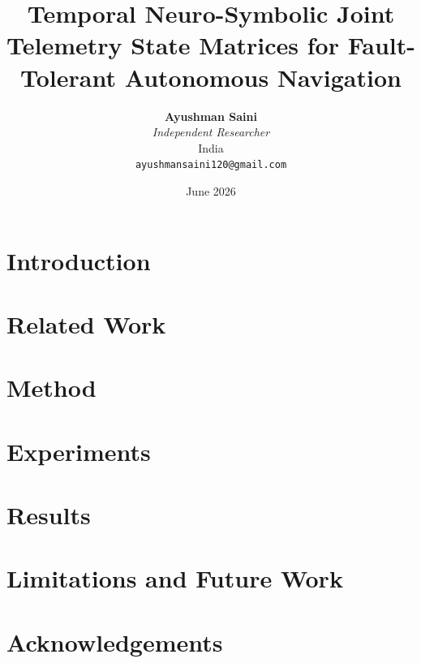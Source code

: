 \documentclass[11pt]{article}
\title{Temporal Neuro-Symbolic Joint Telemetry State Matrices for Fault-Tolerant Autonomous Navigation}
\author{\textbf{Ayushman Saini} \\ \textit{Independent Researcher} \\ India \\ \texttt{ayushmansaini120@gmail.com}}
\date{June 2026}
\begin{document}
\maketitle
\begin{abstract}

\end{abstract}

\section{Introduction}


\section{Related Work}


\section{Method}


\section{Experiments}


\section{Results}


\section{Limitations and Future Work}


\section*{Acknowledgements}


{\small


}
\end{document}
